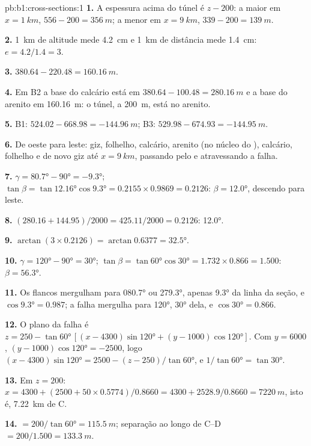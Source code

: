 \begin{solution}{pb:b1:cross-sections:1}
\textbf{1.} A espessura acima do túnel é $z - 200$: a maior em
$x = \qty{1}{km}$, $556 - 200 = \qty{356}{m}$; a menor em $x =
\qty{9}{km}$, $339 - 200 = \qty{139}{m}$.

\textbf{2.} \qty{1}{km} de altitude mede \qty{4.2}{cm} e \qty{1}{km}
de distância mede \qty{1.4}{cm}: $e = 4.2/1.4 = 3$.

\textbf{3.} $380.64 - 220.48 = \qty{160.16}{m}$.

\textbf{4.} Em B2 a base do calcário está em $380.64 - 100.48 =
\qty{280.16}{m}$ e a base do arenito em \qty{160.16}{m}: o
túnel, a \qty{200}{m}, está no arenito.

\textbf{5.} B1: $524.02 - 668.98 = \qty{-144.96}{m}$; B3: $529.98 - 674.93 =
\qty{-144.95}{m}$.

\textbf{6.} De oeste para leste: giz, folhelho, calcário, arenito (no núcleo
do ), calcário, folhelho e de novo giz até
$x = \qty{9}{km}$, passando pelo  e atravessando a falha.

\textbf{7.} $\gamma = \ang{80.7} - \ang{90} = \ang{-9.3}$; $\tan\beta =
\tan\ang{12.16}\cos\ang{9.3} = 0.2155\times0.9869 = 0.2126$: $\beta =
\ang{12.0}$, descendo para leste.

\textbf{8.} $(280.16 + 144.95)/2000 = 425.11/2000 = 0.2126$: \ang{12.0}.

\textbf{9.} $\arctan(3\times0.2126) = \arctan 0.6377 = \ang{32.5}$.

\textbf{10.} $\gamma = \ang{120} - \ang{90} = \ang{30}$; $\tan\beta =
\tan\ang{60}\cos\ang{30} = 1.732\times0.866 = 1.500$: $\beta = \ang{56.3}$.

\textbf{11.} Os flancos mergulham para \ang{080.7} ou \ang{279.3}, apenas
\ang{9.3} da linha da seção, e $\cos\ang{9.3} = 0.987$; a falha mergulha para
\ang{120}, \ang{30} dela, e $\cos\ang{30} = 0.866$.

\textbf{12.} O plano da falha é $z = 250 - \tan\ang{60}\,[(x - 4300)
\sin\ang{120} + (y - 1000)\cos\ang{120}]$. Com $y = 6000$, $(y - 1000)
\cos\ang{120} = -2500$, logo $(x - 4300)\sin\ang{120} = 2500 - (z - 250)/
\tan\ang{60}$, e $1/\tan\ang{60} = \tan\ang{30}$.

\textbf{13.} Em $z = 200$: $x = 4300 + (2500 + 50\times0.5774)/0.8660 =
4300 + 2528.9/0.8660 = \qty{7220}{m}$, isto é, \qty{7.22}{km} de C.

\textbf{14.}  $= 200/\tan\ang{60} = \qty{115.5}{m}$; separação ao longo de
C--D $= 200/1.500 = \qty{133.3}{m}$.


\end{solution}
